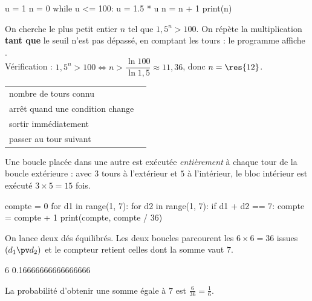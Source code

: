 \begin{savoirfaire}
\begin{codecote}[0.42]
\begin{pythoncol}
u = 1
n = 0
while u <= 100:
    u = 1.5 * u
    n = n + 1
print(n)
\end{pythoncol}
\cote
On cherche le plus petit entier $n$ tel que $1{,}5^{n}>100$. On répète la multiplication \textbf{tant que} le seuil n'est pas dépassé,
en comptant les tours : le programme affiche .\\[1mm]
Vérification : $1{,}5^{n}>100\iff n>\dfrac{\ln100}{\ln1{,}5}\approx11{,}36$, donc $n=\res{12}$.
\end{codecote}
\end{savoirfaire}


\noindent
\begin{minipage}[t]{0.5\linewidth}\vspace{0pt}
{\renewcommand{\arraystretch}{1.35}%
\begin{tabularx}{\linewidth}{@{}YY@{}}
\toprule
{} &  \\
\midrule
nombre de tours connu &  \\
arrêt quand une condition change &  \\
sortir immédiatement &  \\
passer au tour suivant &  \\
\bottomrule
\end{tabularx}}
\end{minipage}\hfill
\begin{minipage}[t]{0.46\linewidth}\vspace{0pt}
\begin{propriete}
\raggedright
Une boucle placée dans une autre est exécutée \emph{entièrement} à chaque tour de la boucle extérieure : avec $3$ tours à l'extérieur
et $5$ à l'intérieur, le bloc intérieur est exécuté $3\times5=15$ fois.
\end{propriete}
\end{minipage}

\begin{exemple}
\begin{codecote}[0.46]
\begin{pythoncol}
compte = 0
for d1 in range(1, 7):
    for d2 in range(1, 7):
        if d1 + d2 == 7:
            compte = compte + 1
print(compte, compte / 36)
\end{pythoncol}
\cote
On lance deux dés équilibrés. Les deux boucles parcourent les $6\times6=36$ issues $(d_1\pv d_2)$ et le compteur retient celles dont
la somme vaut $7$.
\begin{consolecol}
6 0.16666666666666666
\end{consolecol}

\smallskip
La probabilité d'obtenir une somme égale à $7$ est $\frac{6}{36}=\frac16$.
\end{codecote}
\end{exemple}


